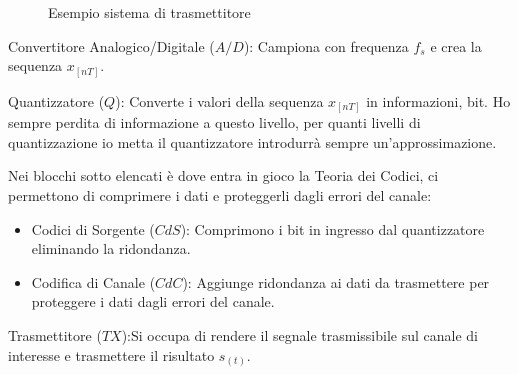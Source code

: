         \begin{figure}[H]
            \centering
            \label{fig:Sistema di comunicazione trasmettitore}
            \caption{Esempio sistema di trasmettitore}
        \end{figure}
        \begin{itemize}
            \item {Convertitore Analogico/Digitale ($A/D$): Campiona con frequenza $f_s$ e crea la sequenza $x_{[nT]}$.}
            \item {Quantizzatore ($Q$): Converte i valori della sequenza $x_{[nT]}$ in informazioni, bit. Ho sempre perdita di informazione a 
                questo livello, per quanti livelli di quantizzazione io metta il quantizzatore introdurrà sempre un'approssimazione. 
            }
            \item{Nei blocchi sotto elencati è dove entra in gioco la Teoria dei Codici, ci permettono di comprimere i dati e proteggerli dagli errori del canale:
                \begin{itemize}
                    \item {Codici di Sorgente ($CdS$): Comprimono i bit in ingresso dal quantizzatore eliminando la ridondanza.}
                    \item {Codifica di Canale ($CdC$): Aggiunge ridondanza ai dati da trasmettere per proteggere i dati dagli errori del canale.}
                \end{itemize}
            \item {Trasmettitore ($TX$):Si occupa di rendere il segnale trasmissibile sul canale di interesse e trasmettere il risultato $s_{(t)}$.}
            }
        \end{itemize}

